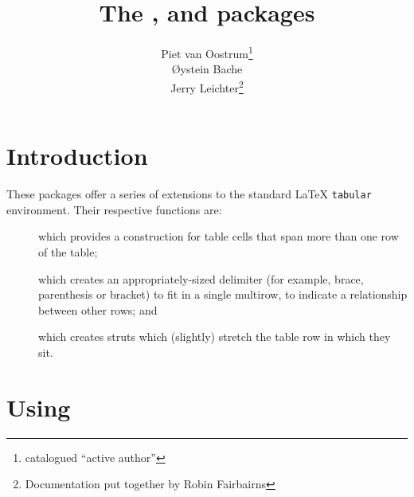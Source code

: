 \documentclass[a4paper]{article}
\begin{document}
\title{The ,
   and
   packages}
\author{Piet van Oostrum\thanks{catalogued ``active author''}\\
  \O{}ystein Bache\\
  Jerry Leichter\thanks{Documentation put together by Robin
    Fairbairns}}
\maketitle

\section{Introduction}
These packages offer a series of extensions to the standard \LaTeX{}
\texttt{tabular} environment.  Their respective functions are:
\begin{description}
\item[] which provides a construction for table cells
  that span more than one row of the table;
\item[] which creates an appropriately-sized
  delimiter (for example, brace, parenthesis or bracket) to fit in a
  single multirow, to indicate a relationship between other rows; and
\item[] which creates struts which (slightly) stretch
  the table row in which they sit.
\end{description}

\section{Using }\label{sec:multirow}
\end{document}
